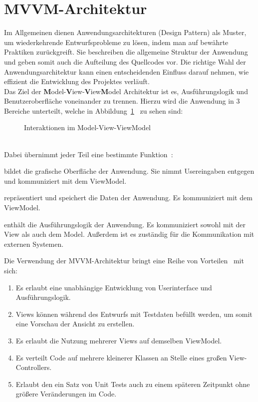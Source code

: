     \section{MVVM-Architektur}\label{sec:mvvm-architektur}
    Im Allgemeinen dienen Anwendungsarchitekturen (Design Pattern) als Muster, um wiederkehrende Entwurfsprobleme zu lösen, indem man auf bewährte Praktiken zurückgreift.
    Sie beschreiben die allgemeine Struktur der Anwendung und geben somit auch die Aufteilung des Quellcodes vor.
    Die richtige Wahl der Anwendungsarchitektur kann einen entscheidenden Einfluss darauf nehmen, wie effizient die Entwicklung des Projektes verläuft.\\
    Das Ziel der \textbf{M}odel-\textbf{V}iew-\textbf{V}iew\textbf{M}odel Architektur ist es, Ausführungslogik und Benutzeroberfläche voneinander zu trennen.
    Hierzu wird die Anwendung in 3 Bereiche unterteilt, welche in Abbildung~\ref{fig:mvvm}~\cite{Sun2017/01} zu sehen sind:\\
    \begin{figure}[h]
        \centering
        
        \caption{Interaktionen im Model-View-ViewModel}
        \label{fig:mvvm}
    \end{figure}\\
    Dabei übernimmt jeder Teil eine bestimmte Funktion~\cite{Mishra2017}:
    \begin{description}[leftmargin=!,labelwidth=3cm]
        \item [View] bildet die grafische Oberfläche der Anwendung. Sie nimmt Usereingaben entgegen und kommuniziert mit dem ViewModel.
        \item [Model] repräsentiert und speichert die Daten der Anwendung. Es kommuniziert mit dem ViewModel.
        \item [ViewModel] enthält die Ausführungslogik der Anwendung. Es kommuniziert sowohl mit der View als auch dem Model. Außerdem ist es zuständig für die Kommunikation mit externen Systemen.
    \end{description}
    Die Verwendung der MVVM-Architektur bringt eine Reihe von Vorteilen~\cite{Anderson2012,Mishra2017} mit sich:
    \begin{enumerate}[label={(\arabic*)}]
        \item Es erlaubt eine unabhängige Entwicklung von Userinterface und Ausführungslogik.
        \item Views können während des Entwurfs mit Testdaten befüllt werden, um somit eine Vorschau der Ansicht zu erstellen.
        \item Es erlaubt die Nutzung mehrerer Views auf demselben ViewModel.
        \item Es verteilt Code auf mehrere kleinerer Klassen an Stelle eines großen View-Controllers.
        \item Erlaubt den ein Satz von Unit Tests auch zu einem späteren Zeitpunkt ohne größere Veränderungen im Code.
    \end{enumerate}

